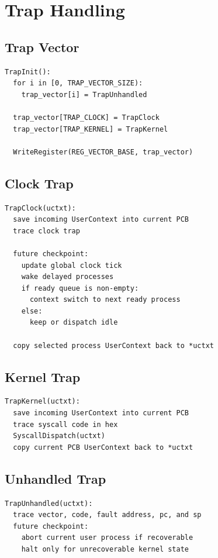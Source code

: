 \documentclass[11pt]{article}
\begin{document}
\section{Trap Handling}

\subsection{Trap Vector}

\begin{lstlisting}[style=yalnixpseudo]
TrapInit():
  for i in [0, TRAP_VECTOR_SIZE):
    trap_vector[i] = TrapUnhandled

  trap_vector[TRAP_CLOCK] = TrapClock
  trap_vector[TRAP_KERNEL] = TrapKernel

  WriteRegister(REG_VECTOR_BASE, trap_vector)
\end{lstlisting}

\subsection{Clock Trap}

\begin{lstlisting}[style=yalnixpseudo]
TrapClock(uctxt):
  save incoming UserContext into current PCB
  trace clock trap

  future checkpoint:
    update global clock tick
    wake delayed processes
    if ready queue is non-empty:
      context switch to next ready process
    else:
      keep or dispatch idle

  copy selected process UserContext back to *uctxt
\end{lstlisting}

\subsection{Kernel Trap}

\begin{lstlisting}[style=yalnixpseudo]
TrapKernel(uctxt):
  save incoming UserContext into current PCB
  trace syscall code in hex
  SyscallDispatch(uctxt)
  copy current PCB UserContext back to *uctxt
\end{lstlisting}

\subsection{Unhandled Trap}

\begin{lstlisting}[style=yalnixpseudo]
TrapUnhandled(uctxt):
  trace vector, code, fault address, pc, and sp
  future checkpoint:
    abort current user process if recoverable
    halt only for unrecoverable kernel state
\end{lstlisting}
\end{document}
